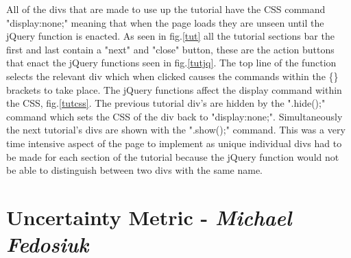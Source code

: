 \documentclass[11pt]{article}
\begin{document}
All of the divs that are made to use up the tutorial have the CSS command "display:none;" meaning that when the page loads they are unseen until the jQuery function is enacted. As seen in fig.\ref{tut} all the tutorial sections bar the first and last contain a "next" and "close" button, these are the action buttons that enact the jQuery functions seen in fig.\ref{tutjq}. The top line of the function selects the relevant div which when clicked causes the commands within the \{\} brackets to take place. The jQuery functions affect the display command within the CSS, fig.\ref{tutcss}. The previous tutorial div's are hidden by the ".hide();" command which sets the CSS of the div back to "display:none;". Simultaneously the next tutorial's divs are shown with the ".show();" command. This was a very time intensive aspect of the page to implement as unique individual divs had to be made for each section of the tutorial because the jQuery function would not be able to distinguish between two divs with the same name. 


\section{Uncertainty Metric - \textit{Michael Fedosiuk}}
\end{document}
